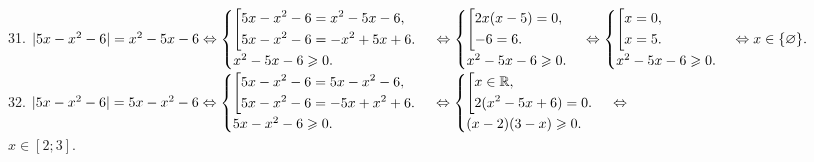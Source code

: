 31. $|5x-x^2-6|=x^2-5x-6 \Leftrightarrow \begin{cases}\left[
      \begin{gathered} 5x-x^2-6=x^2-5x-6,\hfill\\
      5x-x^2-6=-x^2+5x+6.\hfill \end{gathered}\right.\\
x^2-5x-6\geqslant0.\end{cases}\Leftrightarrow \begin{cases}\left[
      \begin{gathered} 2x(x-5)=0,\hfill\\
      -6=6.\hfill \end{gathered}\right.\\
x^2-5x-6\geqslant0.\end{cases}\Leftrightarrow \begin{cases}\left[
      \begin{gathered} x=0,\hfill\\
      x=5.\hfill \end{gathered}\right.\\
x^2-5x-6\geqslant0.\end{cases}\Leftrightarrow x\in\{\varnothing\}.$\\
32. $|5x-x^2-6|=5x-x^2-6\Leftrightarrow \begin{cases}\left[
      \begin{gathered} 5x-x^2-6=5x-x^2-6,\hfill\\
      5x-x^2-6=-5x+x^2+6.\hfill \end{gathered}\right.\\
5x-x^2-6\geqslant0.\end{cases}\Leftrightarrow \begin{cases}\left[
      \begin{gathered} x\in\mathbb{R},\hfill\\
      2(x^2-5x+6)=0.\hfill \end{gathered}\right.\\
(x-2)(3-x)\geqslant0.\end{cases}\Leftrightarrow$\\$ x\in[2;3].$\\
